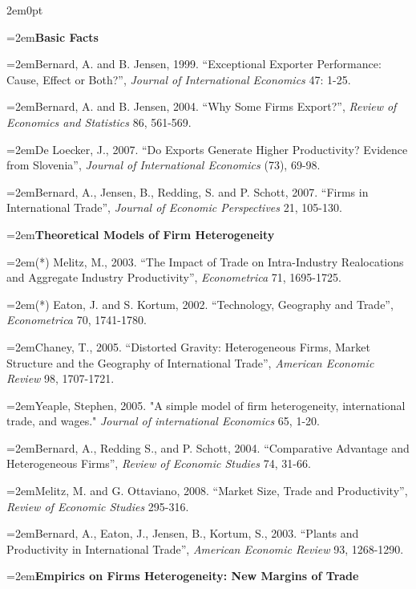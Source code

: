 \documentclass[10pt]{article}
\newcommand{\reading}{\par\hangindent=2em\hangafter=1\noindent}
\newenvironment{readingsblock}{%
  \begin{adjustwidth}{2em}{0pt} %
}{%
  \end{adjustwidth}
}
\begin{document}
  \begin{readingsblock}

  \reading \textbf{Basic Facts} \\[4pt]
  
  \reading Bernard, A. and B. Jensen, 1999. “Exceptional Exporter Performance: Cause, Effect or Both?”, {\it Journal of International Economics} 47: 1-25.
  
  \reading Bernard, A. and B. Jensen, 2004. “Why Some Firms Export?”, {\it Review of Economics and Statistics} 86, 561-569.
  
  \reading De Loecker, J., 2007. “Do Exports Generate Higher Productivity? Evidence from Slovenia”, {\it Journal of International Economics} (73), 69-98.
  
  \reading Bernard, A., Jensen, B., Redding, S. and P. Schott, 2007. “Firms in International Trade”, {\it Journal of Economic Perspectives} 21, 105-130. \\[4pt]
  
  \reading \textbf{Theoretical Models of Firm Heterogeneity} \\[4pt]
  
  \reading (*) Melitz, M., 2003. “The Impact of Trade on Intra-Industry Realocations and Aggregate Industry Productivity”, {\it Econometrica} 71, 1695-1725.
  
  \reading (*) Eaton, J. and S. Kortum, 2002. “Technology, Geography and Trade”, {\it Econometrica} 70, 1741-1780.
  
  \reading Chaney, T., 2005. “Distorted Gravity: Heterogeneous Firms, Market Structure and the Geography of International Trade”, {\it American Economic Review} 98, 1707-1721.
  
  \reading Yeaple, Stephen, 2005. "A simple model of firm heterogeneity, international trade, and wages." {\it Journal of international Economics} 65, 1-20.
  
  \reading Bernard, A., Redding S., and P. Schott, 2004. “Comparative Advantage and Heterogeneous Firms”, {\it Review of Economic Studies} 74, 31-66.
  
  \reading Melitz, M. and G. Ottaviano, 2008. “Market Size, Trade and Productivity”, {\it Review of Economic Studies} 295-316.
  
  \reading Bernard, A., Eaton, J., Jensen, B., Kortum, S., 2003. “Plants and Productivity in International Trade”, {\it American Economic Review} 93, 1268-1290. \\[4pt]
  
  
  \reading \textbf{Empirics on Firms Heterogeneity: New Margins of Trade} \\[4pt]
  

\end{readingsblock}
\end{document}
